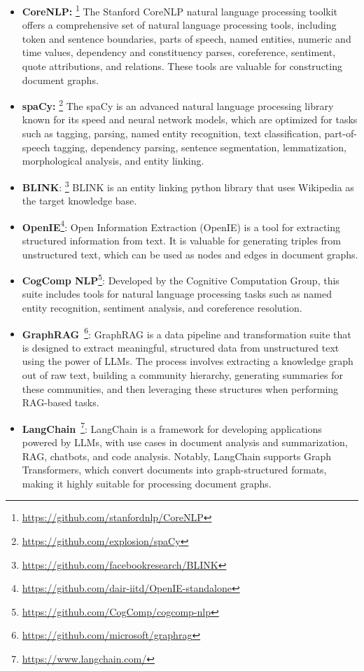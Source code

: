 \begin{itemize}[leftmargin=*]
    \item \textbf{CoreNLP: }\footnote{\url{https://github.com/stanfordnlp/CoreNLP}} The Stanford CoreNLP natural language processing toolkit offers a comprehensive set of natural language processing tools, including token and sentence boundaries, parts of speech, named entities, numeric and time values, dependency and constituency parses, coreference, sentiment, quote attributions, and relations. These tools are valuable for constructing document graphs. 
    \item \textbf{spaCy: }\footnote{\url{https://github.com/explosion/spaCy}} The spaCy is an advanced natural language processing library known for its speed and neural network models, which are optimized for tasks such as tagging, parsing, named entity recognition, text classification, part-of-speech tagging, dependency parsing, sentence segmentation, lemmatization, morphological analysis, and entity linking. 
    \item \textbf{BLINK}: \footnote{\url{https://github.com/facebookresearch/BLINK}} BLINK is an entity linking python library that uses Wikipedia as the target knowledge base.
    \item \textbf{OpenIE}\footnote{\url{https://github.com/dair-iitd/OpenIE-standalone}}: Open Information Extraction (OpenIE) is a tool for extracting structured information from text. It is valuable for generating triples from unstructured text, which can be used as nodes and edges in document graphs.
    \item \textbf{CogComp NLP}\footnote{\url{https://github.com/CogComp/cogcomp-nlp}}: Developed by the Cognitive Computation Group, this suite includes tools for natural language processing tasks such as named entity recognition, sentiment analysis, and coreference resolution.
    \item \textbf{GraphRAG}~\citep{edge2024local}\footnote{\url{https://github.com/microsoft/graphrag}}: GraphRAG is a data pipeline and transformation suite that is designed to extract meaningful, structured data from unstructured text using the power of LLMs. The process involves extracting a knowledge graph out of raw text, building a community hierarchy, generating summaries for these communities, and then leveraging these structures when performing RAG-based tasks.
    \item \textbf{LangChain}~\footnote{\url{https://www.langchain.com/}}: LangChain is a framework for developing applications powered by LLMs, with use cases in document analysis and summarization, RAG, chatbots, and code analysis. Notably, LangChain supports Graph Transformers, which convert documents into graph-structured formats, making it highly suitable for processing document graphs.

\end{itemize}
